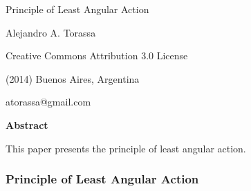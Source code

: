 \documentclass[10pt]{article}
\begin{document}
\begin{center}

{\Large Principle of Least Angular Action}

\bigskip \medskip

Alejandro A. Torassa

\bigskip \medskip

\footnotesize

Creative Commons Attribution 3.0 License

(2014) Buenos Aires, Argentina

atorassa@gmail.com

\bigskip \smallskip

\small

{\bf Abstract}

\bigskip

This paper presents the principle of least angular action.

\end{center}

\normalsize

\vspace{-0.30em}

{\centering\subsubsection*{Principle of Least Angular Action}}

\vspace{+0.75em}
\end{document}
